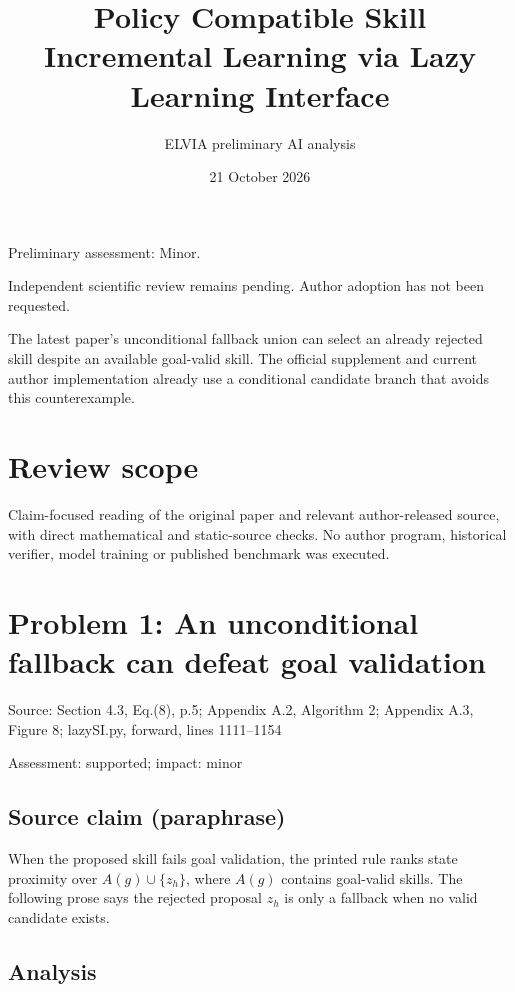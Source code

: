 \documentclass[11pt]{article}
\begin{document}
\title{Policy Compatible Skill Incremental Learning via Lazy Learning Interface}

\author{ELVIA preliminary AI analysis}\date{21 October 2026}\maketitle

Preliminary assessment: Minor.\par

Independent scientific review remains pending. Author adoption has not been requested.

The latest paper’s unconditional fallback union can select an already rejected skill despite an available goal-valid skill. The official supplement and current author implementation already use a conditional candidate branch that avoids this counterexample.

\section*{Review scope}

Claim-focused reading of the original paper and relevant author-released source, with direct mathematical and static-source checks. No author program, historical verifier, model training or published benchmark was executed.

\section*{Problem 1: An unconditional fallback can defeat goal validation}

Source: Section 4.3, Eq.(8), p.5; Appendix A.2, Algorithm 2; Appendix A.3, Figure 8; lazySI.py, forward, lines 1111–1154

Assessment: supported; impact: minor

\subsection*{Source claim (paraphrase)}

When the proposed skill fails goal validation, the printed rule ranks state proximity over \(A(g)\cup\{z_h\}\), where \(A(g)\) contains goal-valid skills. The following prose says the rejected proposal \(z_h\) is only a fallback when no valid candidate exists.

\subsection*{Analysis}
\end{document}
